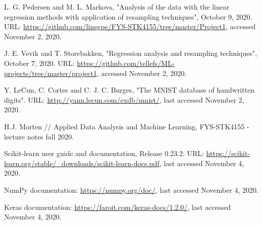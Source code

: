 \documentclass{emulateapj}
\begin{document}
\newpage
\begin{thebibliography}

L. G. Pedersen and M. L. Markova, "Analysis of the data with the linear regression methods with application of resampling techniques", October 9, 2020. URL: \url{https://github.com/linegpe/FYS-STK4155/tree/master/Project1}, accessed November 2, 2020.

J. E. Vevik and T. Storebakken, "Regression analysis and resampling techniques", October 7, 2020. URL: \url{https://github.com/tellefs/ML-projects/tree/master/project1}, accessed November 2, 2020.

Y. LeCun, C. Cortes and C. J. C. Burges, "The MNIST database of handwritten digits". URL: \url{http://yann.lecun.com/exdb/mnist/}, last accessed November 2, 2020.

H.J. Morten // Applied Data Analysis and Machine Learning, FYS-STK4155 - lecture notes fall 2020.

Scikit-learn user guide and documentation, Release 0.23.2: URL: \url{https://scikit-learn.org/stable/_downloads/scikit-learn-docs.pdf}, last accessed November 4, 2020.

NumPy documentation: \url{https://numpy.org/doc/}, last accessed November 4, 2020.

Keras documentation:
\url{https://faroit.com/keras-docs/1.2.0/}, last accessed November 4, 2020.

\end{thebibliography} 
\end{document}
